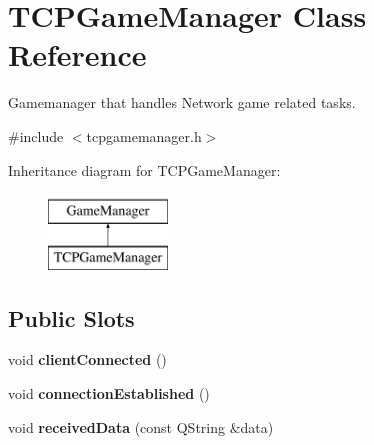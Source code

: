 \hypertarget{classTCPGameManager}{\section{\-T\-C\-P\-Game\-Manager \-Class \-Reference}
\label{classTCPGameManager}
}


\-Gamemanager that handles \-Network game related tasks.  




{\ttfamily \#include $<$tcpgamemanager.\-h$>$}

\-Inheritance diagram for \-T\-C\-P\-Game\-Manager\-:\begin{figure}[H]
\begin{center}
\leavevmode
\includegraphics[height=2.000000cm]{classTCPGameManager}
\end{center}
\end{figure}
\subsection*{\-Public \-Slots}
\begin{DoxyCompactItemize}
\item 
\hypertarget{classTCPGameManager_a616b05b986023096f7475e32c70a059d}{void {\bfseries client\-Connected} ()}\label{classTCPGameManager_a616b05b986023096f7475e32c70a059d}

\item 
\hypertarget{classTCPGameManager_a65421be056b0c53a6deed1bd405ffc6b}{void {\bfseries connection\-Established} ()}\label{classTCPGameManager_a65421be056b0c53a6deed1bd405ffc6b}

\item 
\hypertarget{classTCPGameManager_a6412d2d4a43e5ff353d410e810f60675}{void {\bfseries received\-Data} (const \-Q\-String \&data)}\label{classTCPGameManager_a6412d2d4a43e5ff353d410e810f60675}

\end{DoxyCompactItemize}
